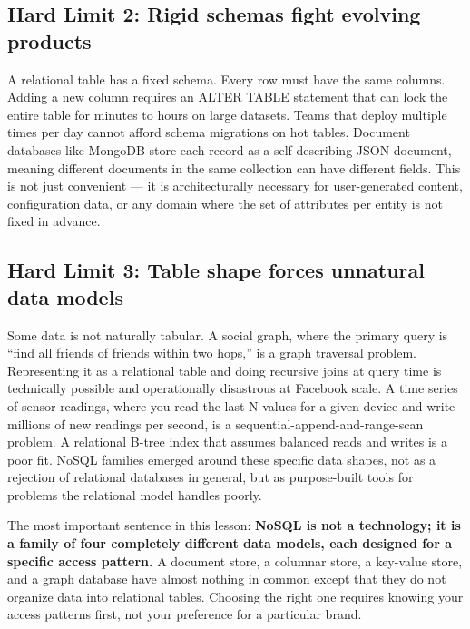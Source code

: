\documentclass[11pt,a4paper]{article}
\begin{document}
\subsection{Hard Limit 2: Rigid schemas fight evolving products}

A relational table has a fixed schema. Every row must have the same columns. Adding a new column requires an ALTER TABLE statement that can lock the entire table for minutes to hours on large datasets. Teams that deploy multiple times per day cannot afford schema migrations on hot tables. Document databases like MongoDB store each record as a self-describing JSON document, meaning different documents in the same collection can have different fields. This is not just convenient --- it is architecturally necessary for user-generated content, configuration data, or any domain where the set of attributes per entity is not fixed in advance.

\subsection{Hard Limit 3: Table shape forces unnatural data models}

Some data is not naturally tabular. A social graph, where the primary query is ``find all friends of friends within two hops,'' is a graph traversal problem. Representing it as a relational table and doing recursive joins at query time is technically possible and operationally disastrous at Facebook scale. A time series of sensor readings, where you read the last N values for a given device and write millions of new readings per second, is a sequential-append-and-range-scan problem. A relational B-tree index that assumes balanced reads and writes is a poor fit. NoSQL families emerged around these specific data shapes, not as a rejection of relational databases in general, but as purpose-built tools for problems the relational model handles poorly.

\begin{insightbox}
The most important sentence in this lesson: \textbf{NoSQL is not a technology; it is a family of four completely different data models, each designed for a specific access pattern.} A document store, a columnar store, a key-value store, and a graph database have almost nothing in common except that they do not organize data into relational tables. Choosing the right one requires knowing your access patterns first, not your preference for a particular brand.
\end{insightbox}
\end{document}
